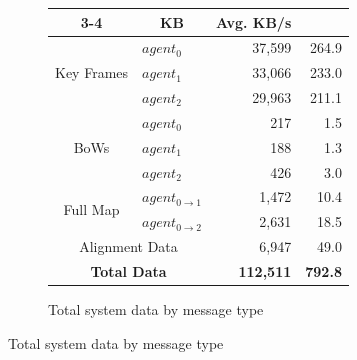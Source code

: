\begin{figure}[h]
\begin{subfigure}[b]{0.45\linewidth}
{{                \def\arraystretch{1.2}
                \begin{tabular}{ |c|l|r|r| }
                    \cline{3-4}
                    \multicolumn{2}{}{}                       & \multicolumn{1}{|c|}{KB} & \multicolumn{1}{|c|}{Avg. KB/s}         \\
                    \hline
                    \multirow{3}{*}{Key Frames}               & $agent_0$                & 37,599                          & 264.9 \\
                                                              & $agent_1$                & 33,066                          & 233.0 \\
                                                              & $agent_2$                & 29,963                          & 211.1 \\
                    \hline
                    \multirow{3}{*}{BoWs}                     & $agent_0$                & 217                             & 1.5   \\
                                                              & $agent_1$                & 188                             & 1.3   \\
                                                              & $agent_2$                & 426                             & 3.0   \\
                    \hline
                    \multirow{2}{*}{Full Map}
                                                              & $agent_{0\to1}$          & 1,472                           & 10.4  \\
                                                              & $agent_{0\to2}$          & 2,631                           & 18.5  \\
                    \hline
                    \multicolumn{2}{|c|}{Alignment Data}      & 6,947                    & 49.0                                    \\
                    \hline
                    \multicolumn{2}{|c|}{\textbf{Total Data}} & \textbf{112,511}         & \textbf{792.8}                          \\
                    \hline
                \end{tabular}
            }
        }
        \caption{Total system data by message type}
        \vfill


\end{subfigure}
\end{figure}

